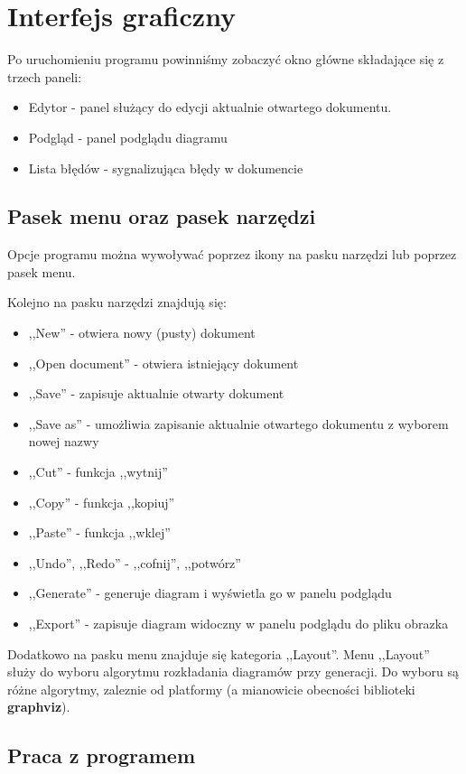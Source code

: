 \section{Interfejs graficzny}
Po uruchomieniu programu powinniśmy zobaczyć okno główne składające się z trzech paneli:

\begin{itemize}
	\item Edytor - panel służący do edycji aktualnie otwartego dokumentu.
	\item Podgląd - panel podglądu diagramu
	\item Lista błędów - sygnalizująca błędy w dokumencie
\end{itemize}

\subsection{Pasek menu oraz pasek narzędzi}
Opcje programu można wywoływać poprzez ikony na pasku narzędzi lub poprzez pasek menu.

Kolejno na pasku narzędzi znajdują się:
\begin{itemize}
	\item ,,New'' - otwiera nowy (pusty) dokument
	\item ,,Open document'' - otwiera istniejący dokument
	\item ,,Save'' - zapisuje aktualnie otwarty dokument
	\item ,,Save as'' - umożliwia zapisanie aktualnie otwartego dokumentu z wyborem nowej nazwy
	\item ,,Cut'' - funkcja ,,wytnij''
	\item ,,Copy'' - funkcja ,,kopiuj''
	\item ,,Paste'' - funkcja ,,wklej''
	\item ,,Undo'', ,,Redo'' - ,,cofnij'', ,,potwórz''
	\item ,,Generate'' - generuje diagram i wyświetla go w panelu podglądu
	\item ,,Export'' - zapisuje diagram widoczny w panelu podglądu do pliku obrazka
\end{itemize}

Dodatkowo na pasku menu znajduje się kategoria ,,Layout''. Menu ,,Layout'' służy do wyboru algorytmu rozkładania diagramów przy generacji. Do wyboru są różne algorytmy, zaleznie od platformy (a mianowicie obecności biblioteki \textbf{graphviz}).

\subsection{Praca z programem}

